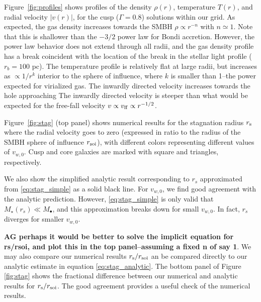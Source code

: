 \documentclass[usenatbib,fleqn]{mn2e}
\newcommand{\rs}{r_s}
\newcommand{\rb}{r_b}
\newcommand{\Mstar}{M_{\star}}
\newcommand{\Mbh}[1][]{M_{\bullet#1}}
\newcommand{\vwO}{v_{w,0}}
\begin{document}
Figure~\ref{fig:profiles} shows profiles of the density $\rho(r)$,
temperature $T(r)$, and radial velocity $|v(r)|$, for the cusp
($\Gamma=0.8$) solutions within our grid.  As expected, the gas
density increases towards the SMBH $\rho\propto r^{-n}$ with
$n\simeq1$.  Note that this is shallower than the $-3/2$ power law for
Bondi accretion. However, the power law behavior does not extend
through all radii, and the gas density profile has a break coincident
with the location of the break in the stellar light profile ($\rb=100$
pc). The temperature profile is relatively flat at large radii, but
increases as $\propto 1/r^{k}$ interior to the sphere of influence,
where $k$ is smaller than 1--the power expected for virialized gas.
The inwardly directed velocity increases towards the hole approaching
The inwardly directed velocity is steeper than what would be expected
for the free-fall velocity $v \propto v_{\rm ff}\propto r^{-1/2}$.


Figure~\ref{fig:stag} (top panel) shows numerical results for the
stagnation radius $r_{\rm s}$ where the radial velocity goes to zero
(expressed in ratio to the radius of the SMBH sphere of influence
$r_{\rm soi}$), with different colors representing different values of
$v_{w,0}$.  Cusp and core galaxies are marked with square and
triangles, respectively.

We also show the simplified analytic result corresponding to $\rs$
approximated from \eqref{eq:stag_simple} as a solid black line. For
$\vwO$, we find good agreement with the analytic prediction. However,
\eqref{eq:stag_simple} is only valid that $\Mstar(\rs) \ll \Mbh$, and
this approximation breaks down for small $\vwO$. In fact, $\rs$
diverges for smaller $\vwO$. 

{\bf AG perhaps it would be better to solve the implicit equation for
  rs/rsoi, and plot this in the top panel--assuming a fixed n of say
  1}. We may also compare our numerical results $r_{\rm s}/r_{\rm
  soi}$ an be compared directly to our analytic estimate in equation
\ref{eq:stag_analytic}.  The bottom panel of Figure \ref{fig:stag}
shows the fractional difference between our numerical and analytic
results for $r_{\rm s}/r_{\rm soi}$.  The good agreement provides a
useful check of the numerical results.
\end{document}
